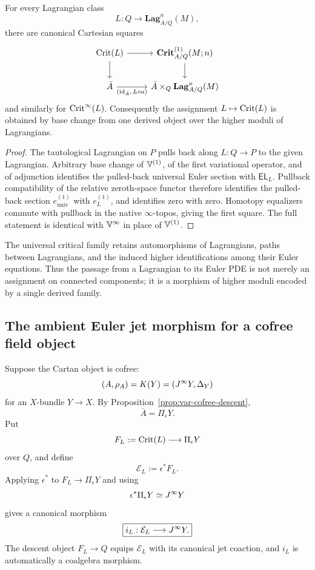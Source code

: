 \begin{theorem}
\label{thm:var-critical-family-pullback}
For every Lagrangian class
\[
    L:Q\longrightarrow\mathbf{Lag}^n_{A/Q}(M),
\]
there are canonical Cartesian squares
\[
\begin{tikzcd}
\Crit(L) \arrow[r] \arrow[d]
& \mathbf{Crit}^{(1)}_{A/Q}(M;n) \arrow[d]
\\
\bar A \arrow[r, "{(\operatorname{id}_{\bar A},\,L\circ a)}"']
& \bar A\times_Q\mathbf{Lag}^n_{A/Q}(M)
\end{tikzcd}
\]
and similarly for \(\operatorname{Crit}^{\infty}(L)\). Consequently the assignment \(L\mapsto\operatorname{Crit}(L)\) is obtained by base change from one derived object over the higher moduli of Lagrangians.
\end{theorem}

\begin{proof}
The tautological Lagrangian on \(P\) pulls back along \(L:Q\to P\) to the given Lagrangian. Arbitrary base change of \(\mathbb V^{(1)}\), of the first variational operator, and of adjunction identifies the pulled-back universal Euler section with \(\mathsf{EL}_L\). Pullback compatibility of the relative zeroth-space functor therefore identifies the pulled-back section \(e_{\mathrm{univ}}^{(1)}\) with \(e_L^{(1)}\), and identifies zero with zero. Homotopy equalizers commute with pullback in the native \(\infty\)-topos, giving the first square. The full statement is identical with \(\mathbb V^{\infty}\) in place of \(\mathbb V^{(1)}\).
\end{proof}

\begin{remark}
\label{rem:var-critical-family-higher}
The universal critical family retains automorphisms of Lagrangians, paths between Lagrangians, and the induced higher identifications among their Euler equations. Thus the passage from a Lagrangian to its Euler PDE is not merely an assignment on connected components; it is a morphism of higher moduli encoded by a single derived family.
\end{remark}

\subsection{The ambient Euler jet morphism for a cofree field object}

\begin{construction}
\label{con:var-el-ambient}
Suppose the Cartan object is cofree:
\[
    (A,\rho_A)=K(Y)=(J^{\infty} Y,\Delta_Y)
\]
for an \(X\)-bundle \(Y\to X\). By Proposition~\ref{prop:var-cofree-descent},
\[
    \bar A=\Pi_\epsilon Y.
\]
Put
\[
    F_L:=\operatorname{Crit}(L)\longrightarrow\Pi_\epsilon Y
\]
over \(Q\), and define
\[
    \mathcal E_L:=\epsilon^*F_L.
\]
Applying \(\epsilon^*\) to \(F_L\to\Pi_\epsilon Y\) and using
\[
    \epsilon^*\Pi_\epsilon Y\simeq J^{\infty} Y
\]
gives a canonical morphism
\[
    \boxed{
    i_L:\mathcal E_L\longrightarrow J^{\infty} Y.
    }
\]
The descent object \(F_L\to Q\) equips \(\mathcal E_L\) with its canonical jet coaction, and \(i_L\) is automatically a coalgebra morphism.
\end{construction}

